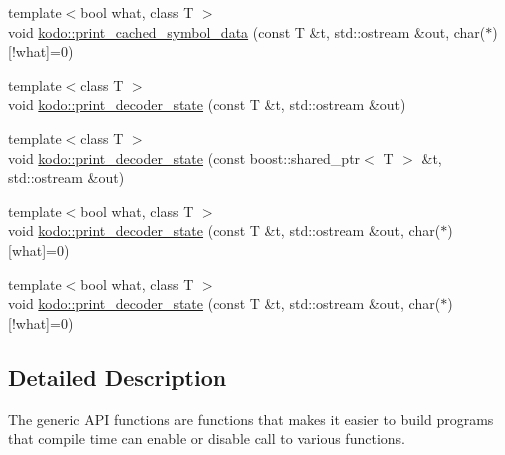 \begin{DoxyCompactItemize}
\begin{DoxyCompactList}\small\item\em \end{DoxyCompactList}\item 
{\footnotesize template$<$bool what, class T $>$ }\\void \hyperlink{group__generic__api_ga07e81e56542b4179eda44d2a2a3f89aa}{kodo\-::print\-\_\-cached\-\_\-symbol\-\_\-data} (const T \&t, std\-::ostream \&out, char($\ast$)\mbox{[}!what\mbox{]}=0)
\begin{DoxyCompactList}\small\item\em \end{DoxyCompactList}\item 
{\footnotesize template$<$class T $>$ }\\void \hyperlink{group__generic__api_ga924f8d925a9bf15ef020657f853907f0}{kodo\-::print\-\_\-decoder\-\_\-state} (const T \&t, std\-::ostream \&out)
\item 
{\footnotesize template$<$class T $>$ }\\void \hyperlink{group__generic__api_gac3889d72f30da12931b08209957dd076}{kodo\-::print\-\_\-decoder\-\_\-state} (const boost\-::shared\-\_\-ptr$<$ T $>$ \&t, std\-::ostream \&out)
\begin{DoxyCompactList}\small\item\em \end{DoxyCompactList}\item 
{\footnotesize template$<$bool what, class T $>$ }\\void \hyperlink{group__generic__api_ga4f59151196d0d2e957a96438a149087f}{kodo\-::print\-\_\-decoder\-\_\-state} (const T \&t, std\-::ostream \&out, char($\ast$)\mbox{[}what\mbox{]}=0)
\begin{DoxyCompactList}\small\item\em \end{DoxyCompactList}\item 
{\footnotesize template$<$bool what, class T $>$ }\\void \hyperlink{group__generic__api_gaefd74f1db665a902b41794daf1b1b070}{kodo\-::print\-\_\-decoder\-\_\-state} (const T \&t, std\-::ostream \&out, char($\ast$)\mbox{[}!what\mbox{]}=0)
\begin{DoxyCompactList}\small\item\em \end{DoxyCompactList}\end{DoxyCompactItemize}


\subsection{Detailed Description}
The generic A\-P\-I functions are functions that makes it easier to build programs that compile time can enable or disable call to various functions. 

